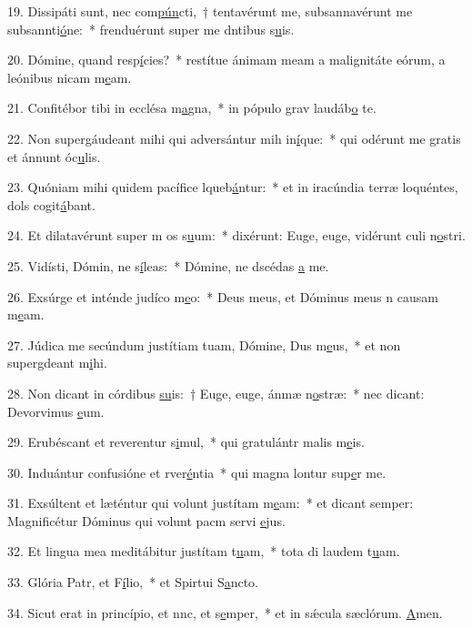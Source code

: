 19. Dissipáti sunt, nec com\uline{pún}cti,~† tentavérunt me, subsannavérunt me subsannti\uline{ó}ne:~* frenduérunt super me dntibus s\uline{u}is.\par 
20. Dómine, quand resp\uline{í}cies?~* restítue ánimam meam a malignitáte eórum, a leónibus nicam m\uline{e}am.\par 
21. Confitébor tibi in ecclésa m\uline{a}gna,~* in pópulo grav laudáb\uline{o} te.\par 
22. Non supergáudeant mihi qui adversántur mih in\uline{í}que:~* qui odérunt me gratis et ánnunt óc\uline{u}lis.\par 
23. Quóniam mihi quidem pacífice lqueb\uline{á}ntur:~* et in iracúndia terræ loquéntes, dols cogit\uline{á}bant.\par 
24. Et dilatavérunt super m os s\uline{u}um:~* dixérunt: Euge, euge, vidérunt culi n\uline{o}stri.\par 
25. Vidísti, Dómin, ne s\uline{í}leas:~* Dómine, ne dscédas \uline{a} me.\par 
26. Exsúrge et inténde judíco m\uline{e}o:~* Deus meus, et Dóminus meus n causam m\uline{e}am.\par 
27. Júdica me secúndum justítiam tuam, Dómine, Dus m\uline{e}us,~* et non supergdeant m\uline{i}hi.\par 
28. Non dicant in córdibus \uline{su}is:~† Euge, euge, ánmæ n\uline{o}stræ:~* nec dicant: Devorvimus \uline{e}um.\par 
29. Erubéscant et reverentur s\uline{i}mul,~* qui gratulántr malis m\uline{e}is.\par 
30. Induántur confusióne et rver\uline{é}ntia~* qui magna lontur sup\uline{e}r me.\par 
31. Exsúltent et læténtur qui volunt justítam m\uline{e}am:~* et dicant semper: Magnificétur Dóminus qui volunt pacm servi \uline{e}jus.\par 
32. Et lingua mea meditábitur justítam t\uline{u}am,~* tota di laudem t\uline{u}am.\par 
33. Glória Patr, et F\uline{í}lio,~* et Spirtui S\uline{a}ncto.\par 
34. Sicut erat in princípio, et nnc, et s\uline{e}mper,~* et in sǽcula sæclórum. \uline{A}men.\par 
